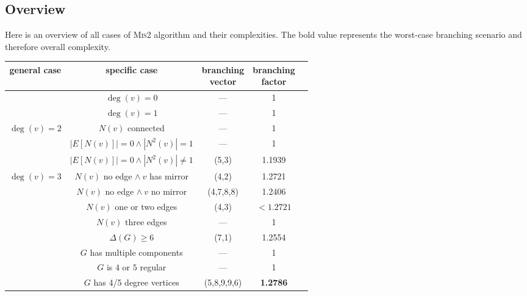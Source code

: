 \subsection{Overview}
Here is an overview of all cases of \textsc{Mis2} algorithm and their complexities. The bold value represents the worst-case branching scenario and therefore overall complexity.
\begin{center}
\begin{tabular}{ |c|c|c|c|c| } 
\hline
general case & specific case & \makecell{branching \\ vector} & \makecell{branching \\ factor} \\ %

\hline
\multirow{2}{5em}{}
& $\deg(v)=0$ & --- &  1 \\
\cline{2-4}
& $\deg(v)=1$ & --- & 1 \\

\hline
\multirow{3}{5em}{$\deg(v)=2$}
& $N(v)$ connected & --- & 1 \\  
\cline{2-4}
& $|E[N(v)]|=0 \land |N^2(v)| = 1$ & --- & 1 \\ 
\cline{2-4}
& $|E[N(v)]|=0 \land |N^2(v)| \neq 1$ & (5,3) & 1.1939 \\ 
\hline

\multirow{4}{5em}{$\deg(v)=3$}
& $N(v)$ no edge $\land\ v $ has mirror & (4,2) & 1.2721 \\ 
\cline{2-4}
& $N(v)$ no edge $\land\ v $ no mirror & (4,7,8,8)  & 1.2406 \\ 
\cline{2-4}
& $N(v)$ one or two edges & (4,3) & $<1.2721$ \\ 
\cline{2-4}
&  $N(v)$ three edges & --- & 1 \\ 
\hline

\multirow{4}{5em}{}
& $\Delta(G)\geq 6$ & (7,1) & 1.2554 \\
\cline{2-4}
& $G$ has multiple components & --- & 1 \\
\cline{2-4}
& $G$ is $4$ or $5$ regular & --- & 1 \\
\cline{2-4}
& $G$ has 4/5 degree vertices & (5,8,9,9,6) & \textbf{1.2786} \\


\hline

\end{tabular}
\end{center}